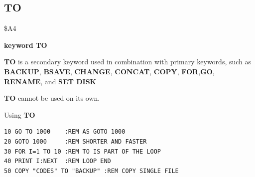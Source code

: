 
\newpage
\subsection{TO}
\begin{description}[leftmargin=2cm,style=nextline]
\item [Token:] \$A4
\item [Format:] {\bf keyword} {\bf TO}
\item [Usage:]  {\bf TO} is a secondary keyword used in
                combination with primary keywords, such as
                {\bf BACKUP}, {\bf BSAVE}, {\bf CHANGE}, {\bf CONCAT},
                {\bf COPY}, {\bf FOR},{\bf GO}, {\bf RENAME}, and {\bf SET DISK}

\item [Remarks:] {\bf TO} cannot be used on its own.

\item [Example:] Using {\bf TO}

\begin{tcolorbox}[colback=black,coltext=white]
\verbatimfont{\codefont}
\begin{verbatim}
10 GO TO 1000    :REM AS GOTO 1000
20 GOTO 1000     :REM SHORTER AND FASTER
30 FOR I=1 TO 10 :REM TO IS PART OF THE LOOP
40 PRINT I:NEXT  :REM LOOP END
50 COPY "CODES" TO "BACKUP" :REM COPY SINGLE FILE
\end{verbatim}
\end{tcolorbox}
\end{description}


\newpage

